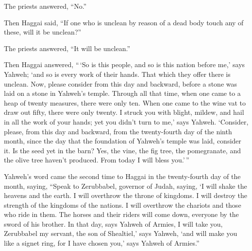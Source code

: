 The priests answered, ``No.''

 Then Haggai said, ``If one who is unclean by reason of a
dead body touch any of these, will it be unclean?''

The priests answered, ``It will be unclean.''

 Then Haggai answered, ``\,`So is this people, and so is
this nation before me,' says Yahweh; `and so is every work of their
hands. That which they offer there is unclean.  Now,
please consider from this day and backward, before a stone was laid on a
stone in Yahweh's temple.  Through all that time, when
one came to a heap of twenty measures, there were only ten. When one
came to the wine vat to draw out fifty, there were only twenty.
 I struck you with blight, mildew, and hail in all the
work of your hands; yet you didn't turn to me,' says Yahweh.
 `Consider, please, from this day and backward, from the
twenty-fourth day of the ninth month, since the day that the foundation
of Yahweh's temple was laid, consider it.  Is the seed
yet in the barn? Yes, the vine, the fig tree, the pomegranate, and the
olive tree haven't produced. From today I will bless you.'\,''

 Yahweh's word came the second time to Haggai in the
twenty-fourth day of the month, saying,  ``Speak to
Zerubbabel, governor of Judah, saying, `I will shake the heavens and the
earth.  I will overthrow the throne of kingdoms. I will
destroy the strength of the kingdoms of the nations. I will overthrow
the chariots and those who ride in them. The horses and their riders
will come down, everyone by the sword of his brother.  In
that day, says Yahweh of Armies, I will take you, Zerubbabel my servant,
the son of Shealtiel,' says Yahweh, `and will make you like a signet
ring, for I have chosen you,' says Yahweh of Armies.''
